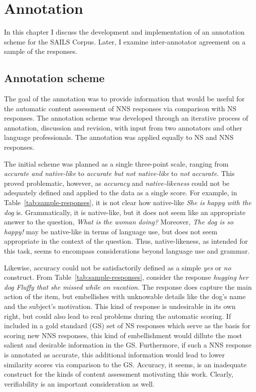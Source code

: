 \chapter{Annotation}
\label{chap:annotation}

In this chapter I discuss the development and implementation of an annotation scheme for the SAILS Corpus. Later, I examine inter-annotator agreement on a sample of the responses.

\section{Annotation scheme}
\label{sec:scheme}
The goal of the annotation was to provide information that would be useful for the automatic content assessment of NNS responses via comparison with NS responses.  
%
%
The annotation scheme was developed through an iterative process of annotation, discussion and revision, with input from two annotators and other language professionals. The annotation was applied equally to NS and NNS responses.

The initial scheme was planned as a single three-point scale, ranging from \textit{accurate and native-like} to \textit{accurate but not native-like} to \textit{not accurate}. This proved problematic, however, as \textit{accuracy} and \textit{native-likeness} could not be adequately defined and applied to the data as a single score.
For example, in Table~\ref{tab:sample-responses}, it is not clear how native-like \textit{She is happy with the dog} is.  Grammatically, it is native-like, but it does not seem like an appropriate answer to the question, \textit{What is the woman doing?} Moreover, \textit{The dog is so happy!} may be native-like in terms of language use, but does not seem appropriate in the context of the question. Thus, native-likeness, as intended for this task, seems to encompass considerations beyond language use and grammar. 

Likewise, accuracy could not be satisfactorily defined as a simple \textit{yes} or \textit{no} construct. From Table~\ref{tab:sample-responses}, consider the response \textit{hugging her dog Fluffy that she missed while on vacation}. The response does capture the main action of the item, but embellishes with unknowable details like the dog's name and the subject's motivation. This kind of response is undesirable in its own right, but could also lead to real problems during the automatic scoring. If included in a gold standard (GS) set of NS responses which serve as the basis for scoring new NNS responses, this kind of embellishment would dillute the most salient and desirable information in the GS. Furthermore, if such a NNS response is annotated as accurate, this additional information would lead to lower similarity scores via comparison to the GS. Accuracy, it seems, is an inadequate construct for the kinds of content assessment motivating this work. Clearly, verifiability is an important consideration as well.

